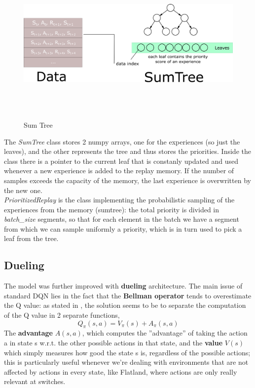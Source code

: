  \begin{figure}[H] 
\includegraphics[height=80mm, width=140mm, scale=0.5]{figures/SumTree.png}
\centering
\caption{Sum Tree}
\label{fig:s4} 
\end{figure}
\noindent
The \textit{SumTree} class stores 2 numpy arrays, one for the experiences (so just the leaves), and the other represents the tree and thus stores the priorities. Inside the class there is a pointer to the current leaf that is constanly updated and used whenever a new experience is added to the replay memory. If the number of samples exceeds the capacity of the memory, the last experience is overwritten by the new one. \\
\textit{PrioritizedReplay} is the class implementing the probabilistic sampling of the experiences from the memory (sumtree): the total priority is divided in \textit{batch\_size} segments, so that for each element in the batch we have a segment from which we can sample uniformly a priority, which is in turn used to pick a leaf from the tree. 	

\subsection{Dueling}

The model was further improved with \textbf{dueling} architecture. The main issue of standard DQN lies in the fact that the \textbf{Bellman operator} tends to overestimate the Q value: as stated in \cite{dueling}, the solution seems to be to separate the computation of the Q value in 2 separate functions, $$Q_{\pi}(s,a) = V_{\pi}(s) + A_{\pi}(s,a) $$ The \textbf{advantage} $A(s,a)$, which computes the  ''advantage'' of taking the action a in state s w.r.t. the other possible actions in that state, and the \textbf{value} $V(s)$ which simply measures how good the state s is, regardless of the possible actions; this is particularly useful whenever we're dealing with environments that are not affected by actions in every state, like Flatland, where actions are only really relevant at switches.

